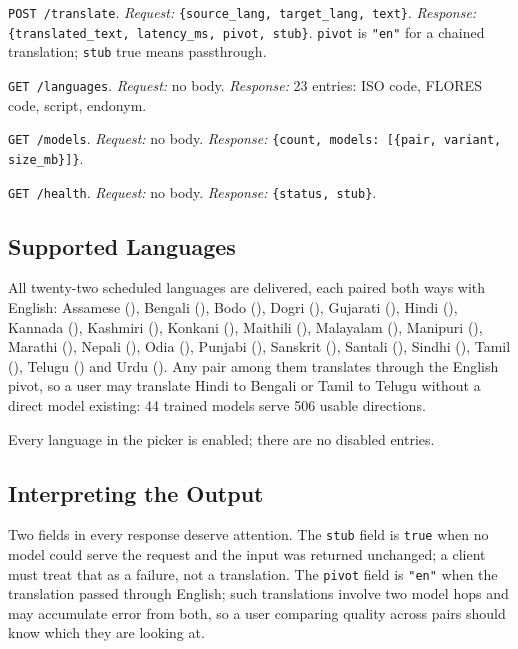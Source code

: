 \begin{bullets}
\item \texttt{POST /translate}. \emph{Request:} \texttt{\{source\_lang, target\_lang, text\}}. \emph{Response:} \texttt{\{translated\_text, latency\_ms, pivot, stub\}}. \texttt{pivot} is \texttt{"en"} for a chained translation; \texttt{stub} true means passthrough.
\item \texttt{GET /languages}. \emph{Request:} no body. \emph{Response:} 23 entries: ISO code, FLORES code, script, endonym.
\item \texttt{GET /models}. \emph{Request:} no body. \emph{Response:} \texttt{\{count, models: [\{pair, variant, size\_mb\}]\}}.
\item \texttt{GET /health}. \emph{Request:} no body. \emph{Response:} \texttt{\{status, stub\}}.
\end{bullets}

\subsection{Supported Languages}
\label{subsec:supportedlangs}

All twenty-two scheduled languages are delivered, each paired both ways with
English: Assamese (), Bengali (), Bodo (),
Dogri (), Gujarati (), Hindi (), Kannada
(), Kashmiri (), Konkani (), Maithili
(), Malayalam (), Manipuri (), Marathi
(), Nepali (), Odia (), Punjabi
(), Sanskrit (), Santali (), Sindhi
(), Tamil (), Telugu () and Urdu
(). Any pair among them translates through the English pivot, so a
user may translate Hindi to Bengali or Tamil to Telugu without a direct model
existing: 44 trained models serve 506 usable directions.

Every language in the picker is enabled; there are no disabled entries.

\subsection{Interpreting the Output}
\label{subsec:interpreting}

Two fields in every response deserve attention. The \texttt{stub} field is
\texttt{true} when no model could serve the request and the input was returned
unchanged; a client must treat that as a failure, not a translation. The
\texttt{pivot} field is \texttt{"en"} when the translation passed through
English; such translations involve two model hops and may accumulate error from
both, so a user comparing quality across pairs should know which they are
looking at.
